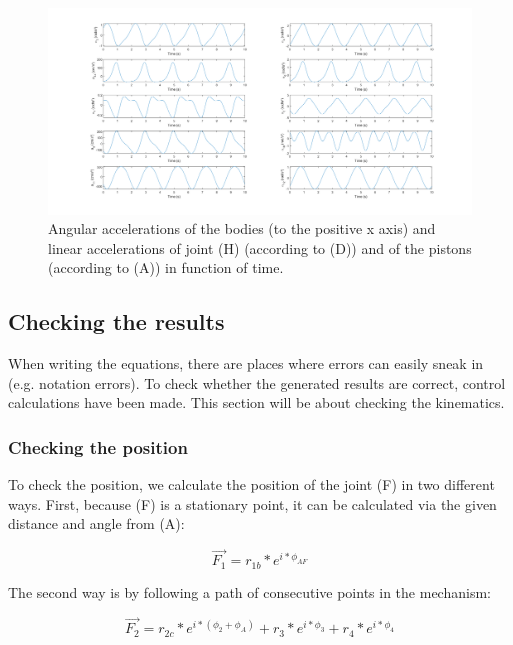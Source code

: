 \documentclass[a4paper]{article}
\begin{document}
\begin{figure}[h]
	\centering
	
	\includegraphics[width = \textwidth]{kinacc.png}
	
	\caption{Angular accelerations of the bodies (to the positive x axis) and linear accelerations of joint (H) (according to (D)) and of the pistons (according to (A)) in function of time.}
	\label{fig:kinacc}
	
\end{figure}


\subsection{Checking the results}

When writing the equations, there are places where errors can easily sneak in (e.g. notation errors). To check whether the generated results are correct, control calculations have been made. This section will be about checking the kinematics.

\subsubsection{Checking the position}

To check the position, we calculate the position of the joint (F) in two different ways. First, because (F) is a stationary point, it can be calculated via the given distance and angle from (A):

\begin{equation}
	\vec{F_1} = r_{1b}*e^{i*\phi_{AF}}
\end{equation}

The second way is by following a path of consecutive points in the mechanism:

\begin{equation}
	\vec{F_2} = r_{2c}*e^{i*(\phi_2 + \phi_A)} + r_3*e^{i*\phi_3} + r_4*e^{i*\phi_4}
\end{equation}
\end{document}
